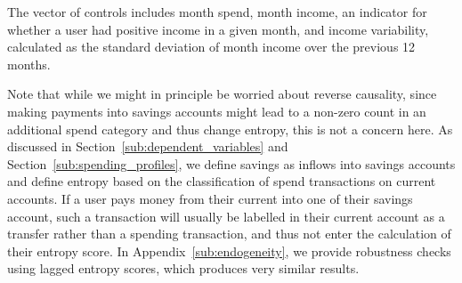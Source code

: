 The vector of controls includes month spend, month income, an indicator for
whether a user had positive income in a given month, and income
variability, calculated as the standard deviation of month income over the
previous 12 months.

Note that while we might in principle be worried about reverse causality, since
making payments into savings accounts might lead to a non-zero count in an
additional spend category and thus change entropy, this is not a concern here.
As discussed in Section~\ref{sub:dependent_variables} and
Section~\ref{sub:spending_profiles}, we define savings as inflows into savings
accounts and define entropy based on the classification of spend transactions
on current accounts. If a user pays money from their current into one of their
savings account, such a transaction will usually be labelled in their current
account as a transfer rather than a spending transaction, and thus not enter
the calculation of their entropy score. In Appendix~\ref{sub:endogeneity}, we
provide robustness checks using lagged entropy scores, which produces very
similar results.


